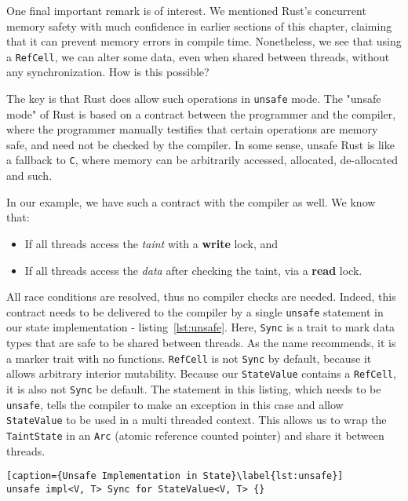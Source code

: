 One final important remark is of interest. We mentioned Rust's concurrent memory safety with much confidence in
earlier sections of this chapter, claiming that it can prevent memory errors in compile time.
Nonetheless, we see that using a \texttt{RefCell}, we can alter some data, even when shared between
threads, without any synchronization. How is this possible?

The key is that Rust does allow such operations in \texttt{unsafe} mode. The "unsafe mode" of Rust is
based on a contract between the programmer and the compiler, where the programmer manually
testifies that certain operations are memory safe, and need not be checked by the compiler. In
some sense, unsafe Rust is like a fallback to \texttt{C}, where memory can be arbitrarily accessed,
allocated, de-allocated and such.

In our example, we have such a contract with the compiler as well. We know that:

\begin{itemize}
	\item If all threads access the \textit{taint} with a \textbf{write} lock, and
	\item If all threads access the \textit{data} after checking the taint, via a \textbf{read} lock.
\end{itemize}

All race conditions are resolved, thus no compiler checks are needed. Indeed, this contract needs to
be delivered to the compiler by a single \texttt{unsafe} statement in our state
implementation - listing~\ref{lst:unsafe}.
Here, \texttt{Sync} is a trait to mark data types that are safe to be shared between threads. As the name
recommends, it is a marker trait with no functions. \texttt{RefCell} is not \texttt{Sync} by
default, because it allows arbitrary interior mutability. Because our \texttt{StateValue} contains
a \texttt{RefCell}, it is also not \texttt{Sync} be default. The statement in this listing, which needs to be
\texttt{unsafe}, tells the compiler to make an exception in this case and allow \texttt{StateValue}
to be used in a multi threaded context. This allows us to wrap the \texttt{TaintState} in an
\texttt{Arc} (atomic reference counted pointer) and share it between threads.

\begin{lstlisting}[caption={Unsafe Implementation in State}\label{lst:unsafe}]
unsafe impl<V, T> Sync for StateValue<V, T> {}
\end{lstlisting}




